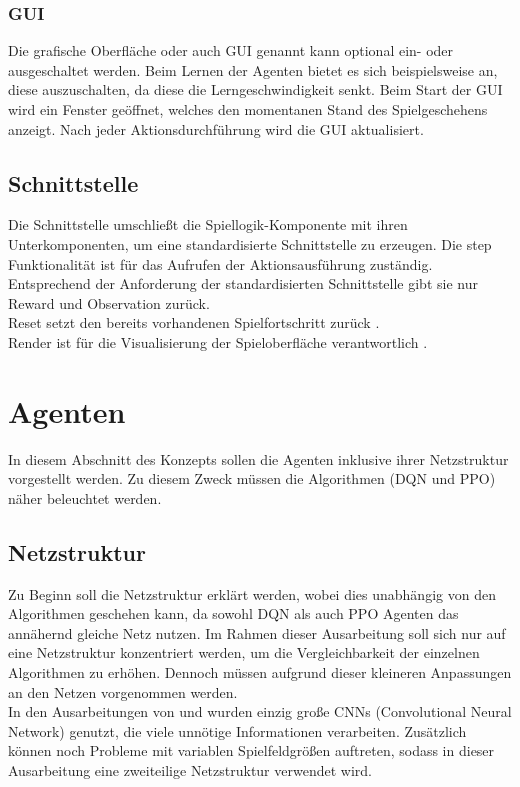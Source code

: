 \subsubsection{GUI} \label{susubsec:Konzept_GUI}
Die grafische Oberfläche oder auch GUI genannt kann optional ein- oder ausgeschaltet werden. Beim Lernen der Agenten bietet es sich beispielsweise an, diese auszuschalten, da diese die Lerngeschwindigkeit senkt. Beim Start der GUI wird ein Fenster geöffnet, welches den momentanen Stand des Spielgeschehens anzeigt. Nach jeder Aktionsdurchführung wird die GUI aktualisiert.

\subsection{Schnittstelle} \label{subsec:Konzept_Schnittstelle}
Die Schnittstelle umschließt die Spiellogik-Komponente mit ihren Unterkomponenten, um eine standardisierte Schnittstelle zu erzeugen.
Die step Funktionalität ist für das Aufrufen der Aktionsausführung zuständig. Entsprechend der Anforderung der standardisierten Schnittstelle  gibt sie nur Reward und Observation zurück.\\
Reset setzt den bereits vorhandenen Spielfortschritt zurück .\\
Render ist für die Visualisierung der Spieloberfläche verantwortlich .

\section{Agenten} \label{sec:Konzept_Agenten}
In diesem Abschnitt des Konzepts sollen die Agenten inklusive ihrer Netzstruktur vorgestellt werden. Zu diesem Zweck müssen die Algorithmen (DQN und PPO) näher beleuchtet werden.

\subsection{Netzstruktur} \label{subsec:Konzept_Netzstruktur}
Zu Beginn soll die Netzstruktur erklärt werden, wobei dies unabhängig von den Algorithmen geschehen kann, da sowohl DQN als auch PPO Agenten das annähernd gleiche Netz nutzen.
Im Rahmen dieser Ausarbeitung soll sich nur auf eine Netzstruktur konzentriert werden, um die Vergleichbarkeit der einzelnen Algorithmen zu erhöhen. Dennoch müssen aufgrund dieser kleineren Anpassungen an den Netzen vorgenommen werden.\\
In den Ausarbeitungen von \cite{Autonomous_Agents_in_Snake_Game_via_DRL} und \cite{UAV} wurden einzig große CNNs (Convolutional Neural Network) genutzt, die viele unnötige Informationen verarbeiten. Zusätzlich können noch Probleme mit variablen Spielfeldgrößen auftreten, sodass in dieser Ausarbeitung eine zweiteilige Netzstruktur verwendet wird. 

